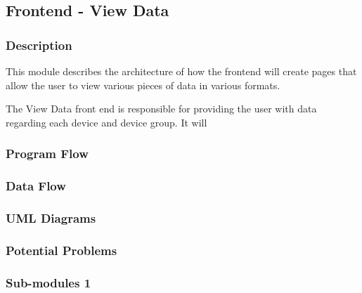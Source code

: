 
\subsection{Frontend - View Data}

\subsubsection{Description}

This module describes the architecture of how the frontend will create pages that allow the user to view various pieces of data in various formats.

The View Data front end is responsible for providing the user with data regarding each device and device group. 
It will 

\subsubsection{Program Flow}




\subsubsection{Data Flow}


\subsubsection{UML Diagrams}


\subsubsection{Potential Problems}


\subsubsection{Sub-modules 1}

